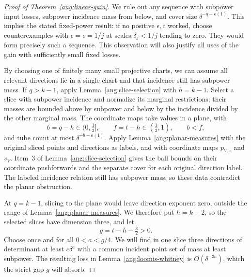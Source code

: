 \begin{proof}[Proof of Theorem~\ref{ang:linear-gain}]
We rule out any sequence with subpower input losses, subpower incidence
mass from below, and cover size $\delta^{-q-o(1)}$. This implies the
stated fixed-power result: if no positive $\epsilon,c$ worked, choose
counterexamples with $\epsilon=c=1/j$ at scales
$\delta_j<1/j$ tending to zero. They would form precisely such a
sequence. This observation will also justify all uses of the gain with
sufficiently small fixed losses.

By choosing one of finitely many small projective charts, we can assume
all relevant directions lie in a single chart and that incidence still
has subpower mass. If $q>k-1$, apply
Lemma~\ref{ang:slice-selection} with $h=k-1$. Select a slice with
subpower incidence and normalize its marginal restrictions; their
masses are bounded above by subpower and below by the incidence divided
by the other marginal mass. The coordinate maps take values in a plane, with
\[
 b=q-h\in(0,\tfrac12],\qquad
 f=t-h\in(\tfrac12,1),\qquad b<f,
\]
and tube count at most $\delta^{-b-o(1)}$. Apply
Lemma~\ref{ang:planar-measures} with the original sliced points and
directions as labels, and with coordinate maps $p_{V,z}$ and $v_V$.
Item~3 of Lemma~\ref{ang:slice-selection} gives the ball bounds on their
coordinate pushforwards and the separate cover for each original direction
label. The labeled incidence relation still has subpower mass, so these
data contradict the planar obstruction.

At $q=k-1$, slicing to the plane would leave direction exponent zero,
outside the range of Lemma~\ref{ang:planar-measures}. We therefore put
$h=k-2$, so the selected slices have dimension three, and let
\[
 g=t-h-\tfrac32>0.
\]
Choose once and for all $0<a<g/4$. We will find in one slice three
directions of determinant at least $c\delta^a$ with a common incident
point set of mass at least subpower. The resulting loss in
Lemma~\ref{ang:loomis-whitney} is $O(\delta^{-3a})$, which the
strict gap $g$ will absorb.


\end{proof}
